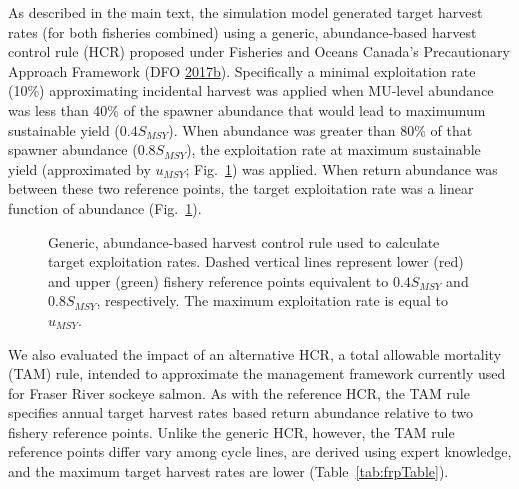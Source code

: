 \documentclass[11pt]{book}
\begin{document}
As described in the main text, the simulation model generated target harvest rates (for both fisheries combined) using a generic, abundance-based harvest control rule (HCR) proposed under Fisheries and Oceans Canada's Precautionary Approach Framework (DFO \protect\hyperlink{ref-DFO2017b}{2017}\protect\hyperlink{ref-DFO2017b}{b}). Specifically a minimal exploitation rate (10\%) approximating incidental harvest was applied when MU-level abundance was less than 40\% of the spawner abundance that would lead to maximumum sustainable yield (\(0.4{S}_{MSY}\)). When abundance was greater than 80\% of that spawner abundance (\(0.8{S}_{MSY}\)), the exploitation rate at maximum sustainable yield (approximated by \({u}_{MSY}\); Fig.~\ref{fig:genHCR}) was applied. When return abundance was between these two reference points, the target exploitation rate was a linear function of abundance (Fig.~\ref{fig:genHCR}).
\begin{figure}[htb]

{\centering {} 

}

\caption{Generic, abundance-based harvest control rule used to calculate target exploitation rates. Dashed vertical lines represent lower (red) and upper (green) fishery reference points equivalent to $0.4{S}_{MSY}$ and $0.8{S}_{MSY}$, respectively. The maximum exploitation rate is equal to ${u}_{MSY}$.}\label{fig:genHCR}
\end{figure}
We also evaluated the impact of an alternative HCR, a total allowable mortality (TAM) rule, intended to approximate the management framework currently used for Fraser River sockeye salmon. As with the reference HCR, the TAM rule specifies annual target harvest rates based return abundance relative to two fishery reference points. Unlike the generic HCR, however, the TAM rule reference points differ vary among cycle lines, are derived using expert knowledge, and the maximum target harvest rates are lower (Table~\ref{tab:frpTable}).
\end{document}
